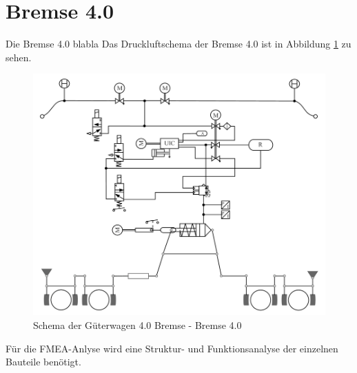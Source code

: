 \section{Bremse 4.0}
Die Bremse 4.0 blabla 
Das Druckluftschema der \gls{Bremse 4.0} ist in Abbildung \ref{fig:GW40Schema} zu sehen.\par
\begin{figure}[hbt]
    \centering
    \includegraphics[width=\textwidth]{Bilder/GW40Schema.png}
    \caption{Schema der Güterwagen 4.0 Bremse - Bremse 4.0}
    \label{fig:GW40Schema}
\end{figure}
Für die FMEA-Anlyse wird eine Struktur- und Funktionsanalyse der einzelnen Bauteile benötigt. 

